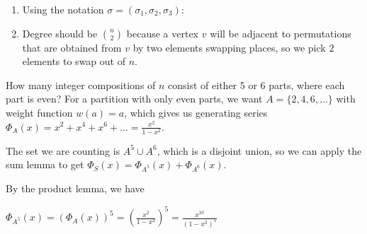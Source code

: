 \begin{enumerate}
\begin{enumerate}
    \end{enumerate}
    \answer \begin{enumerate}
        \item Using the notation $\sigma = (\sigma_1 , \sigma_2 , \sigma_3)$:

\begin{center}
\end{center}


        \item Degree should be $n \choose 2$ because a vertex $v$ will be adjacent to permutations that are obtained from $v$ by two elements swapping places, so we pick $2$ elements to swap out of $n$.
        
    \end{enumerate}
   
    \newpage
    
     How many integer compositions of $n$ consist of either 5 or 6 parts, where each part is even?
    \answer For a partition with only even parts, we want $A = \{2, 4, 6, \dots\}$ with weight function $w(a) = a$, which gives us generating series $\Phi_A(x) = x^2 + x^4 + x^6 + \dots = \frac{x^2}{1-x^2}$.
    
    The set we are counting is $A^5 \cup A^6$, which is a disjoint union, so we can apply the sum lemma to get $\Phi_S(x) = \Phi_{A^5}(x) + \Phi_{A^6}(x)$.

    By the product lemma, we have 
    \begin{center}
        $\Phi_{A^5}(x) = (\Phi_{A}(x))^5 = (\frac{x^2}{1-x^2})^5 =  \frac{x^{10}}{(1-x^2)^5}$


\end{center}
\end{enumerate}
